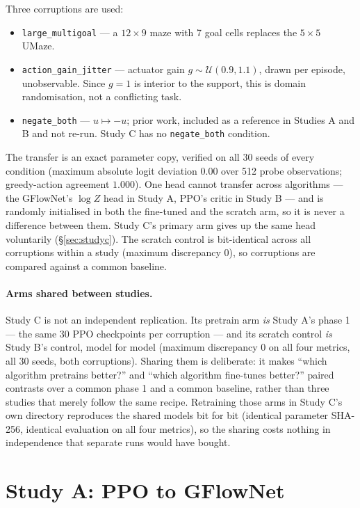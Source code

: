 Three corruptions are used:

\begin{itemize}
  \item \texttt{large\_multigoal} --- a $12\times9$ maze with 7 goal cells replaces the $5\times5$ UMaze.
  \item \texttt{action\_gain\_jitter} --- actuator gain $g\sim\mathcal{U}(0.9,1.1)$, drawn per episode, unobservable. Since $g=1$ is interior to the support, this is domain randomisation, not a conflicting task.
  \item \texttt{negate\_both} --- $u\mapsto-u$; prior work, included as a reference in Studies A and B and not re-run. Study C has no \texttt{negate\_both} condition.
\end{itemize}

The transfer is an exact parameter copy, verified on all 30 seeds of every
condition (maximum absolute logit deviation $0.00$ over 512 probe observations;
greedy-action agreement $1.000$). One head cannot transfer across algorithms ---
the GFlowNet's $\log Z$ head in Study A, PPO's critic in Study B --- and is
randomly initialised in both the fine-tuned and the scratch arm, so it is never
a difference between them. Study C's primary arm gives up the same head
voluntarily (\S\ref{sec:studyc}). The scratch control is bit-identical across
all corruptions within a study (maximum discrepancy $0$), so corruptions are
compared against a common baseline.

\paragraph{Arms shared between studies.} Study C is not an independent
replication. Its pretrain arm \emph{is} Study A's phase 1 --- the same 30 PPO
checkpoints per corruption --- and its scratch control \emph{is} Study B's
control, model for model (maximum discrepancy $0$ on all four metrics, all 30
seeds, both corruptions). Sharing them is deliberate: it makes
``which algorithm pretrains better?'' and ``which algorithm fine-tunes better?''
paired contrasts over a common phase 1 and a common baseline, rather than three
studies that merely follow the same recipe. Retraining those arms in Study C's
own directory reproduces the shared models bit for bit (identical parameter
SHA-256, identical evaluation on all four metrics), so the sharing costs nothing
in independence that separate runs would have bought.

\clearpage
\section{Study A: PPO to GFlowNet}

